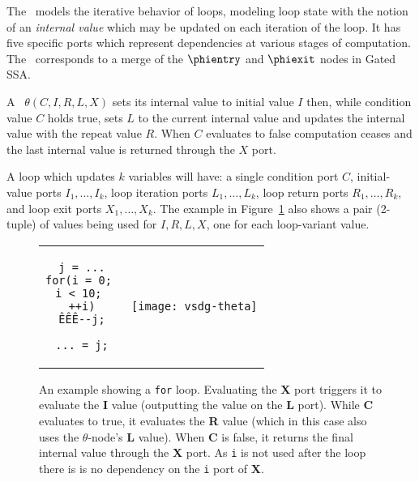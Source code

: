 The \Tn\ models the iterative behavior of loops, modeling loop state with the notion of an \emph{internal value} which may be updated on each iteration of the loop. 
It has five specific ports which represent dependencies at various stages of computation. 
The \Tn\ corresponds to a merge of the $\phientry$ and $\phiexit$ nodes in Gated SSA.
%

A \Tn\ $\theta(C,I,R,L,X)$ sets its internal value to initial value $I$ then, while condition value $C$ holds true, sets $L$ to the current internal value and updates the internal value with the repeat value $R$. 
When $C$ evaluates to false computation ceases and the last internal value is returned through the $X$ port.

%
A loop which updates $k$ variables will have: 
a single condition port $C$, initial-value ports $I_1,\ldots,I_k$, loop iteration ports $L_1,\ldots,L_k$, loop return ports $R_1,\ldots,R_k$, and loop exit ports $X_1,\ldots,X_k$. 
The example in Figure~\ref{fig:thetatuple} also shows a pair (2-tuple) of values being used for $I,R,L,X$, one for each loop-variant value.


\begin{figure}[!ht]
\centering
\begin{tabular}{cc} \cline{1-1}
\begin{minipage}[c][\height][t]{0.9in}
\begin{verbatim}
j = ...
for(i = 0; 
i < 10; 
++i)
ÊÊÊ--j;
	
... = j;
\end{verbatim}
\end{minipage}
&
\begin{minipage}[c][\height][b]{3.0in}
\texttt{[image: vsdg-theta]}
\end{minipage} \\ \cline{1-1}
\end{tabular}

\caption{An example showing a \texttt{for} loop. 
  Evaluating the \textbf{X} port triggers it to evaluate the \textbf{I} value (outputting the value on the \textbf{L} port). 
  While \textbf{C} evaluates to true, it evaluates the \textbf{R} value (which in this case also uses the $\theta$-node's \textbf{L} value). 
  When \textbf{C} is false, it returns the final internal value through the \textbf{X} port. 
  As \texttt{i} is not used after the loop there is is no dependency on the \texttt{i} port of \textbf{X}.}
\label{fig:thetatuple}
\end{figure}

